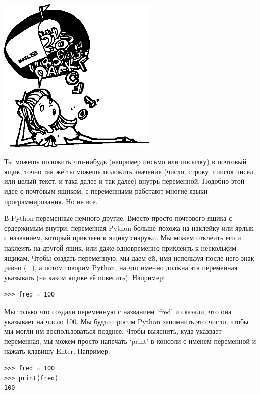 \begin{center}
\includegraphics*[width=76mm]{girlbubble.eps}
\end{center}

Ты можешь положить что-нибудь (например письмо или посылку) в почтовый ящик, точно так же ты можешь положить значение (число, строку, список чисел или целый текст, и така далее и так далее) внутрь переменной.  Подобно этой идее с почтовым ящиком, с переменными работают многие языки программирования. Но не все.

В Python переменные немного другие. Вместо просто почтового ящика с срдержимым внутри, переменная Python больше похожа на наклейку или ярлык с названием, который приклеен к ящику снаружи.  Мы можем отклеить его и наклеить на другой ящик, или даже одновременно приклеить к нескольким ящикам.  Чтобы создать переменную, мы даем ей, имя используя после него знак равно (=), а потом говорим Python, на что именно должна эта переменная указывать (на каком ящике её повесить).  Например: 


\begin{listing}
\begin{verbatim}
>>> fred = 100
\end{verbatim}
\end{listing}

Мы только что создали переменную с названием `fred' и сказали, что она указывает на число 100.  Мы будто просим Python запомнить это число, чтобы мы могли им воспользоваться позднее.  Чтобы выяснить, куда указвает переменная, мы можем просто напечать `print' в консоли с именем переменной и нажать клавишу Enter.  Например:

\begin{listing}
\begin{verbatim}
>>> fred = 100
>>> print(fred)
100
\end{verbatim}
\end{listing}

